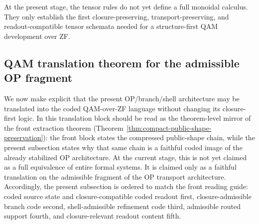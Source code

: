 \begin{remark}
At the present stage, the tensor rules do not yet define a full monoidal calculus. They only establish the first closure-preserving, transport-preserving, and readout-compatible tensor schemata needed for a structure-first QAM development over ZF.
\end{remark}


\subsection*{QAM translation theorem for the admissible OP fragment}

We now make explicit that the present OP/branch/shell architecture may be translated into the coded QAM-over-ZF language without changing its closure-first logic. In  this translation block should be read as the theorem-level mirror of the front extraction theorem (Theorem~\ref{thm:compact-public-shape-preservation}): the front block states the compressed public-shape chain, while the present subsection states why that same chain is a faithful coded image of the already stabilized OP architecture. At the current stage, this is not yet claimed as a full equivalence of entire formal systems. It is claimed only as a faithful translation on the admissible fragment of the OP transport architecture. Accordingly, the present subsection is ordered to match the front reading guide: coded source state and closure-compatible coded readout first, closure-admissible branch code second, shell-admissible refinement code third, admissible routed support fourth, and closure-relevant readout content fifth.


